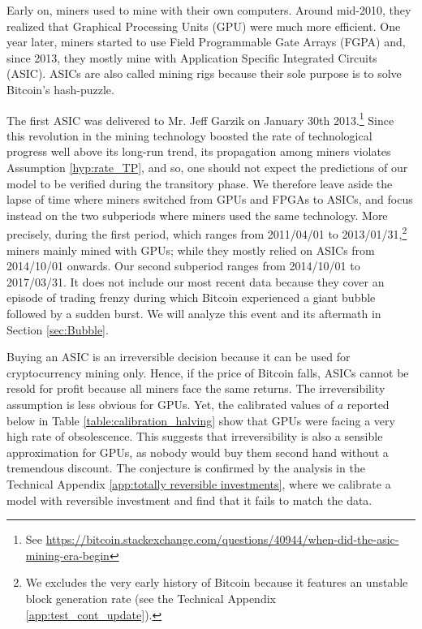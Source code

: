 \documentclass[12pt, a4paper]{article}
\begin{document}
Early on, miners used to mine with their own computers. Around mid-2010, they
realized that Graphical Processing Units (GPU) were much more efficient. One
year later, miners started to use Field Programmable Gate Arrays (FGPA) and,
since 2013, they mostly mine with Application Specific Integrated Circuits
(ASIC). ASICs are also called mining rigs because their sole purpose
is to solve Bitcoin's hash-puzzle.

The first ASIC was delivered to Mr. Jeff Garzik on January 30th 2013.\footnote{See \url{https://bitcoin.stackexchange.com/questions/40944/when-did-the-asic-mining-era-begin}}
Since this revolution in the mining technology boosted the rate of technological progress well
above its long-run trend, its propagation among miners violates Assumption \ref{hyp:rate_TP}, and
so, one should not expect the predictions of our model to be verified
during the transitory phase. We
therefore leave aside the lapse of time where
miners switched from GPUs and FPGAs to ASICs, and focus instead on the two
subperiods where miners used the same technology. More precisely, during the
first period, which ranges from 2011/04/01 to 2013/01/31,\footnote{We excludes the very early
history of Bitcoin because it features an unstable block generation rate (see the Technical Appendix \ref{app:test_cont_update}).}
miners mainly mined with GPUs;
while they mostly relied on ASICs from 2014/10/01 onwards.
Our second subperiod ranges from 2014/10/01 to 2017/03/31.
It does not include our most recent data because they cover an episode of trading frenzy during which Bitcoin experienced
a giant bubble followed by a sudden burst.
We will analyze this event and its aftermath in Section \ref{sec:Bubble}.

Buying an ASIC is an irreversible decision because it can be
used for cryptocurrency mining only. Hence, if the price of Bitcoin falls, ASICs
cannot be resold for profit because all miners face the same returns.
The irreversibility assumption is less obvious for GPUs. Yet, the calibrated values of $a$ reported below
in Table \ref{table:calibration_halving} show that GPUs were facing a very high rate of obsolescence.
This suggests that irreversibility is also a sensible approximation for GPUs, as
nobody would buy them second hand without a tremendous discount. The conjecture
is confirmed by the analysis in the Technical Appendix \ref{app:totally reversible investments}, where we calibrate a model with reversible investment
and find that it fails to match the data.
\end{document}
